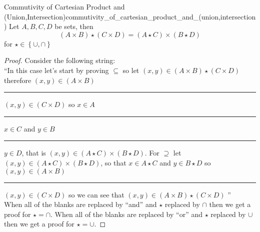 \begin{proposition}
{Commutivity of Cartesian Product and
(Union,Intersection)}{commutivity_of_cartesian_product_and_(union,intersection)}
Let \(A, B, C, D \) be sets, then
\[
\left(A \times B\right) \star \left(C \times D\right) = \left(A \star C
\right) \times \left(B \star D\right)
\]
for \(\star \in \left\{\cup, \cap \right\} \)
\end{proposition}
\begin{proof}
    Consider the following string: \\
    ``In this case let's start by proving \( \subseteq  \) so
    let  \(\left(x, y\right) \in \left(A \times B\right)
    \star \left(C \times D\right) \) therefore \(\left(x,y\right) \in \left(A \times B
    \right) \) \rule{.5cm}{0.15mm} \(\left(x,y\right) \in \left(C
\times D\right) \) so \(x \in A \) \rule{.5cm}{0.15mm} \(x \in C
\) and \(y \in B \)
    \rule{.5cm}{0.15mm} \(y \in D \), that
    is \(\left(x, y\right) \in \left(A \star C\right) \times \left(B
    \star D\right) \). For \( \supseteq  \) let \( \left( x, y \right) \in \left(
A \star C\right) \times \left( B \star D \right)  \), so that \( x \in A \star  C
\) and \( y \in B \star D \) so \( \left( x ,y  \right) \in  \left( A \times B
\right)  \) \rule{.5cm}{0.15mm} \( \left( x, y \right) \in  \left( C \times D \right)  \) so we
can see that \( \left( x, y  \right) \in  \left( A \times B \right) \star  \left(
C \times D\right)  \) ''\\
    When all of the blanks are replaced by ``and'' and \( \star  \) replaced by
    \( \cap  \) then we get a proof for \( \star = \cap  \). When all of the
    blanks are replaced by ``or'' and \( \star  \) replaced by \( \cup  \) then
    we get a proof for \( \star = \cup  \).
\end{proof}
